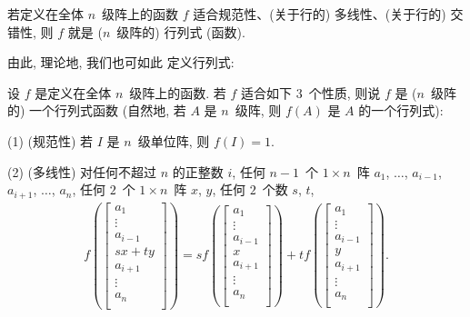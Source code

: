 \documentclass[../libro.tex]{subfiles}
\begin{document}
\begin{theorem}
    若定义在全体 \(n\)~级阵上的函数 \(f\)
    适合规范性、(关于行的) 多线性、(关于行的) 交错性,
    则 \(f\) 就是 (\(n\)~级阵的) 行列式 (函数).
\end{theorem}

由此, 理论地, 我们也可如此%
定义行列式:

\begin{definition}
    设 \(f\) 是定义在全体 \(n\)~级阵上的函数.
    若 \(f\) 适合如下 \(3\)~个性质, 则说
    \(f\) 是 (\(n\)~级阵的) 一个行列式函数
    (自然地, 若 \(A\) 是 \(n\)~级阵,
    则 \(f(A)\) 是 \(A\) 的一个行列式):

    (1)
    (规范性)
    若 \(I\) 是 \(n\)~级单位阵,
    则 \(f(I) = 1\).

    (2)
    (多线性)
    对任何不超过 \(n\) 的正整数 \(i\),
    任何 \(n-1\)~个 \(1 \times n\)~阵
    \(a_1\), \(\dots\), \(a_{i-1}\),
    \(a_{i+1}\), \(\dots\), \(a_n\),
    任何 \(2\)~个 \(1 \times n\)~阵 \(x\), \(y\),
    任何 \(2\)~个数 \(s\), \(t\),
    \begin{align*}
        f
        {\left(
                \begin{bmatrix}
                    a_1     \\
                    \vdots  \\
                    a_{i-1} \\
                    sx + ty \\
                    a_{i+1} \\
                    \vdots  \\
                    a_{n}   \\
        \end{bmatrix}\right)}
        =
        s
        f
        {\left(
                \begin{bmatrix}
                    a_1     \\
                    \vdots  \\
                    a_{i-1} \\
                    x       \\
                    a_{i+1} \\
                    \vdots  \\
                    a_{n}   \\
        \end{bmatrix}\right)}
        +
        t
        f
        {\left(
                \begin{bmatrix}
                    a_1     \\
                    \vdots  \\
                    a_{i-1} \\
                    y       \\
                    a_{i+1} \\
                    \vdots  \\
                    a_{n}   \\
        \end{bmatrix}\right)}.
    \end{align*}


\end{definition}
\end{document}
